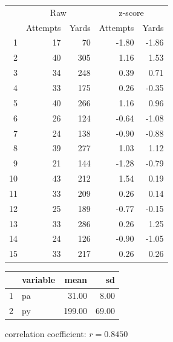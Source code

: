 \documentclass{exam}
\begin{document}
  \begin{table}[H]
    \centering
      \begin{tabular}{rrrrr}
        \toprule
           & \multicolumn{2}{c}{Raw} & \multicolumn{2}{c}{z-score } \\
        \cmidrule(r){2-3} \cmidrule(r){4-5} 
           & Attempts & Yards & Attempts & Yards \\
        \midrule
        1  & 17       & 70    & -1.80    & -1.86 \\
        2  & 40       & 305   & 1.16     & 1.53 \\
        3  & 34       & 248   & 0.39     & 0.71 \\
        4  & 33       & 175   & 0.26     & -0.35 \\
        5  & 40       & 266   & 1.16     & 0.96 \\
        6  & 26       & 124   & -0.64    & -1.08 \\
        7  & 24       & 138   & -0.90    & -0.88 \\
        8  & 39       & 277   & 1.03     & 1.12 \\
        9  & 21       & 144   & -1.28    & -0.79 \\
        10 & 43       & 212   & 1.54     & 0.19 \\
        11 & 33       & 209   & 0.26     & 0.14 \\
        12 & 25       & 189   & -0.77    & -0.15 \\
        13 & 33       & 286   & 0.26     & 1.25 \\
        14 & 24       & 126   & -0.90    & -1.05 \\
        15 & 33       & 217   & 0.26     & 0.26 \\
        \bottomrule
      \end{tabular}
  \end{table}

  \begin{table}[ht]
    \centering
    \begin{tabular}{rlrr}
      \toprule
        & variable & mean   & sd \\
      \midrule
      1 & pa       & 31.00  & 8.00 \\
      2 & py       & 199.00 & 69.00 \\
      \bottomrule
    \end{tabular}
  \end{table}

  correlation coefficient: $r = 0.8450$
\end{document}

